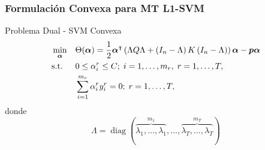 \documentclass{beamer}
\DeclareMathOperator{\Diag}{diag}
\newcommand{\upper}[1]{\expandafter\MakeUppercase\expandafter{#1}}
\newcommand{\mymat}[1]{\upper{#1}}
\newcommand{\myvec}[1]{\bm{#1}}
\newcommand{\fv}[1]{\myvec{#1}}
\newcommand{\fm}[1]{\mymat{#1}}
\newcommand{\nsamples}{n}
\newcommand{\ntasks}{T}
\newcommand{\npertask}{m}
\begin{document}
  \begin{frame}
      \frametitle{Formulación Convexa para MT L1-SVM}
  
      \begin{block}{Problema Dual - SVM Convexa}
            \begin{equation}\nonumber
                  \begin{aligned}
                  & \min_{\fv{\alpha}} && \Theta(\fv{\alpha}) = \frac{1}{2} \fv{\alpha}^\intercal \left(\Lambda \fm{Q} \Lambda + \left(\fm{I}_{\nsamples} - \Lambda \right) \fm{K} \left(\fm{I}_{\nsamples} - \Lambda \right) \right) \fv{\alpha} - \fv{p} \fv{\alpha} \\
                  & \text{s.t.}
                  & & 0 \leq \alpha_i^r \leq C ; \; i=1, \ldots, \npertask_r,\; r=1, \ldots, \ntasks ,\\
                  & & & \sum_{i=1}^{m_r} \alpha_i^r y_i^r = 0;\;  r=1, \ldots, \ntasks , \\
                  \end{aligned}
              \end{equation}
              donde
              \begin{equation}\nonumber
                  \Lambda = \Diag(\overbrace{\lambda_1, \ldots, \lambda_1}^{\npertask_1}, \ldots, \overbrace{\lambda_\ntasks, \ldots, \lambda_\ntasks}^{\npertask_\ntasks})
              \end{equation}
      \end{block}

  \end{frame}
\end{document}

